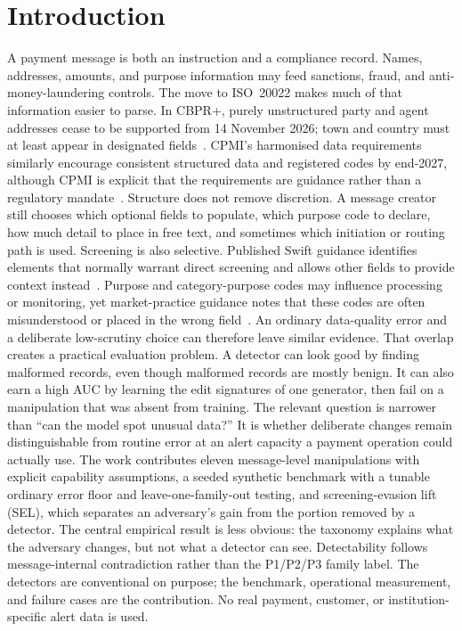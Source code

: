 \documentclass[conference]{IEEEtran}
\begin{document}
\section{Introduction}
A payment message is both an instruction and a compliance record. Names,
addresses, amounts, and purpose information may feed sanctions, fraud, and
anti-money-laundering controls. The move to ISO~20022 makes much of that
information easier to parse. In CBPR+, purely unstructured party and agent
addresses cease to be supported from 14 November 2026; town and country must
at least appear in designated fields~\cite{swift2026addr}. CPMI's harmonised
data requirements similarly encourage consistent structured data and
registered codes by end-2027, although CPMI is explicit that the requirements
are guidance rather than a regulatory mandate~\cite{cpmi2026}.
Structure does not remove discretion. A message creator still chooses which
optional fields to populate, which purpose code to declare, how much detail to
place in free text, and sometimes which initiation or routing path is used.
Screening is also selective. Published Swift guidance identifies elements that
normally warrant direct screening and allows other fields to provide context
instead~\cite{swiftgp2021}. Purpose and category-purpose codes may influence
processing or monitoring, yet market-practice guidance notes that these codes
are often misunderstood or placed in the wrong field~\cite{pmpg2024}. An
ordinary data-quality error and a deliberate low-scrutiny choice can therefore
leave similar evidence.
That overlap creates a practical evaluation problem. A detector can look good
by finding malformed records, even though malformed records are mostly benign.
It can also earn a high AUC by learning the edit signatures of one generator,
then fail on a manipulation that was absent from training. The relevant
question is narrower than ``can the model spot unusual data?'' It is whether
deliberate changes remain distinguishable from routine error at an alert
capacity a payment operation could actually use.
The work contributes eleven message-level manipulations with explicit
capability assumptions, a seeded synthetic benchmark with a tunable ordinary error floor and leave-one-family-out testing, and screening-evasion lift (SEL),
which separates an adversary's gain from the portion removed by a detector.
The central empirical result is less obvious: the taxonomy explains what the
adversary changes, but not what a detector can see. Detectability follows
message-internal contradiction rather than the P1/P2/P3 family label. The
detectors are conventional on purpose; the benchmark, operational measurement,
and failure cases are the contribution. No real payment, customer, or
institution-specific alert data is used.
\end{document}
